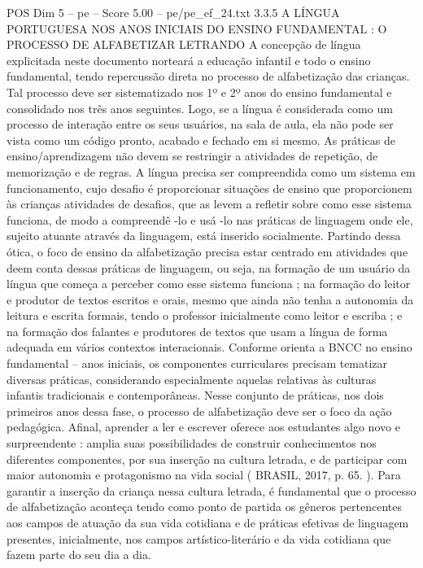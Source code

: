 \begin{textsample}{POS Dim 5 – pe – Score 5.00 – pe/pe\_ef\_24.txt}  \label{ex:f5_pos_205}
3.3.5 A LÍNGUA PORTUGUESA NOS ANOS INICIAIS DO ENSINO FUNDAMENTAL : O PROCESSO DE ALFABETIZAR LETRANDO A concepção de língua explicitada neste documento norteará a educação infantil e todo o ensino fundamental, tendo repercussão direta no processo de alfabetização das crianças.
Tal processo deve ser sistematizado nos 1º e 2º anos do ensino fundamental e consolidado nos três anos seguintes.
Logo, se a língua é considerada como um processo de interação entre os seus usuários, na sala de aula, ela não pode ser vista como um código pronto, acabado e fechado em si mesmo.
As práticas de ensino/aprendizagem não devem se restringir a atividades de repetição, de memorização e de regras.
A língua precisa ser compreendida como um sistema em funcionamento, cujo desafio é proporcionar situações de ensino que proporcionem às crianças atividades de desafios, que as levem a refletir sobre como esse sistema funciona, de modo a compreendê -lo e usá -lo nas práticas de linguagem onde ele, sujeito atuante através da linguagem, está inserido socialmente.
Partindo dessa ótica, o foco de ensino da alfabetização precisa estar centrado em atividades que deem conta dessas práticas de linguagem, ou seja, na formação de um usuário da língua que começa a perceber como esse sistema funciona ; na formação do leitor e produtor de textos escritos e orais, mesmo que ainda não tenha a autonomia da leitura e escrita formais, tendo o professor inicialmente como leitor e escriba ; e na formação dos falantes e produtores de textos que usam a língua de forma adequada em vários contextos interacionais.
Conforme orienta a BNCC no ensino fundamental – anos iniciais, os componentes curriculares precisam tematizar diversas práticas, considerando especialmente aquelas relativas às culturas infantis tradicionais e contemporâneas.
Nesse conjunto de práticas, nos dois primeiros anos dessa fase, o processo de alfabetização deve ser o foco da ação pedagógica.
Afinal, aprender a ler e escrever oferece aos estudantes algo novo e surpreendente : amplia suas possibilidades de construir conhecimentos nos diferentes componentes, por sua inserção na cultura letrada, e de participar com maior autonomia e protagonismo na vida social ( BRASIL, 2017, p. 65. ).
Para garantir a inserção da criança nessa cultura letrada, é fundamental que o processo de alfabetização aconteça tendo como ponto de partida os gêneros pertencentes aos campos de atuação da sua vida cotidiana e de práticas efetivas de linguagem presentes, inicialmente, nos campos artístico-literário e da vida cotidiana que fazem parte do seu dia a dia.

\end{textsample}
